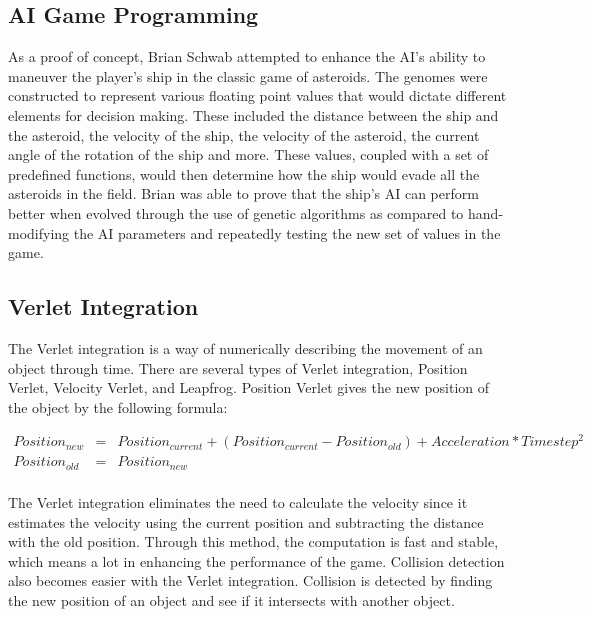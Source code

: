 \subsection{AI Game Programming}
As a proof of concept, Brian Schwab attempted to enhance the AI's ability to maneuver
the player's ship in the classic game of asteroids\cite{Schwab04}. The genomes were
constructed to represent various floating point values that would dictate different
elements for decision making. These included the distance between the ship and the asteroid,
the velocity of the ship, the velocity of the asteroid, the current angle of the rotation
of the ship and more. These values, coupled with a set of predefined functions, would then
determine how the ship would evade all the asteroids in the field. Brian was able to prove
that the ship's AI can perform better when evolved through the use of genetic algorithms as
compared to hand-modifying the AI parameters and repeatedly testing the new set of values in
the game.

\subsection{Verlet Integration}
The Verlet integration is a way of numerically describing  the movement of an object through
time\cite{website:Bitterli09}. There are several types of Verlet integration,
Position Verlet, Velocity 
Verlet, and Leapfrog. Position Verlet gives the new position of the object by the following 
formula:

\begin{eqnarray}
Position_{new}  & = &
Position_{current} + 
(Position_{current} - Position_{old}) +
Acceleration * Timestep^2 \nonumber \\
Position_{old} & = & Position_{new} \nonumber \\
\label{Verlet}
\end{eqnarray}

The Verlet integration eliminates the need to calculate the velocity since it estimates 
the velocity using the current position and subtracting the distance with the old position. 
Through this method, the computation is fast and stable, which means a lot in enhancing the
performance of the game. Collision detection also becomes easier with the Verlet integration.
Collision is detected by finding the new position of an object and see if it intersects with
another object.


